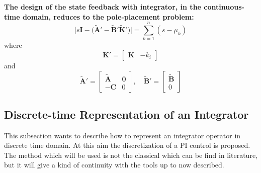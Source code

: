 \documentclass[11pt,a4paper,oneside]{book}
\numberwithin{equation}{section}
\theoremstyle{it}
\theoremstyle{definition}
\begin{document}
\vspace{5mm}
\begin{mybox}
	\textbf{The design of the state feedback with integrator, in the 
		continuous-time domain, reduces to the pole-placement problem:} 
	\begin{equation}\label{eq_servo_ct_14a}
		\Bigg|s\mathbf{I}-\Big(\tilde{\mathbf{A}}' - 
		\tilde{\mathbf{B}}'\tilde{\mathbf{K}}'\Big)\Bigg|=\sum_{k=1}^{n}(s-\mu_k)
	\end{equation}
	where
	\begin{equation}\label{eq_servo_ct_14b}
		{\mathbf{K}}'= \begin{bmatrix}
			{\mathbf{K}} & -k_i
		\end{bmatrix}
	\end{equation}
	and
	\begin{equation}\label{eq_servo_ct_15}
		\tilde{\mathbf{A}}'  = 
		\begin{bmatrix}
			\tilde{\mathbf{A}} & \mathbf{0} \\[6pt]
			-{\mathbf{C}} & 0
		\end{bmatrix}, \quad
		\tilde{\mathbf{B}}'  = 
		\begin{bmatrix}
			\tilde{\mathbf{B}} \\[6pt] 0
		\end{bmatrix}
	\end{equation}
\end{mybox}

\subsection{Discrete-time Representation of an Integrator}
This subsection wants to describe how to represent an integrator operator in 
discrete time domain. At this aim the discretization of a PI control is 
proposed. The method which will be used is not the classical which can be find 
in literature, but it will give a kind of continuity with the tools up to now 
described.
\end{document}
